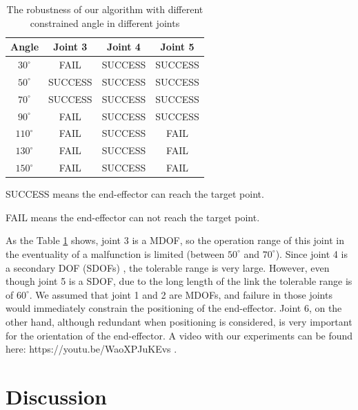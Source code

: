 \documentclass{ieeeaccess}
\newcommand{\degree}{^\circ}
\begin{document}
\begin{table}[!hb]
	\centering
	\caption{The robustness of our algorithm with different constrained angle in different joints }\label{tab:aStrangeTable}%
	\begin{threeparttable}
		\begin{tabular}{cccc}
			\toprule
			\textbf{Angle}& \textbf{Joint 3}& \textbf{Joint 4}& \textbf{Joint 5}\\
			\midrule
			\textbf{$30\degree $}& FAIL& SUCCESS&SUCCESS\\
			\textbf{$50\degree $}& SUCCESS& SUCCESS&SUCCESS\\
			\textbf{$70\degree $}& SUCCESS& SUCCESS&SUCCESS\\
			\textbf{$90\degree $}& FAIL& SUCCESS&SUCCESS\\
			\textbf{$110\degree $}& FAIL& SUCCESS&FAIL\\
			\textbf{$130\degree $}& FAIL& SUCCESS&FAIL\\
			\textbf{$150\degree $}& FAIL& SUCCESS&FAIL\\
			\bottomrule
		\end{tabular}
		\begin{tablenotes}
			\footnotesize
			\item[1] SUCCESS means the end-effector can reach the target point.
			\item[2] FAIL means the end-effector can not reach the target point.
		\end{tablenotes}
	\end{threeparttable}
\end{table}

As the Table \ref{tab:aStrangeTable} shows, joint 3 is a MDOF, so the operation range of this joint in the eventuality of a malfunction is limited (between $50\degree$ and $70\degree$). Since joint 4 is a secondary DOF (SDOFs)\cite{nakamura1987task} , the tolerable range is very large. However, even though joint 5 is a SDOF, due to the long length of the link the tolerable range is of $60\degree $. We assumed that joint 1 and 2 are MDOFs, and failure in those joints would immediately constrain the positioning of the end-effector. Joint 6, on the other hand, although redundant when positioning is considered, is very important for the orientation of the end-effector. A video with our experiments can be found here: https://youtu.be/WaoXPJuKEvs .


\section{Discussion}
\label{section:discussion}
\end{document}
